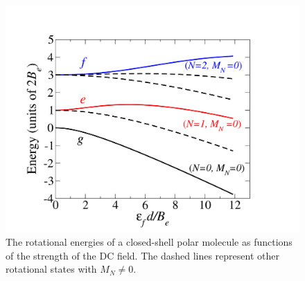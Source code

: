 \begin{figure}[htbp]
\centering
\includegraphics[width=\linewidth]{Figure3.pdf}
\caption{The rotational energies of a closed-shell polar molecule as functions of the strength of the DC field. The
 dashed lines represent other rotational states with $M_{N} \neq 0$. 
}
\label{fig:rotationalEnergy}
\end{figure}

